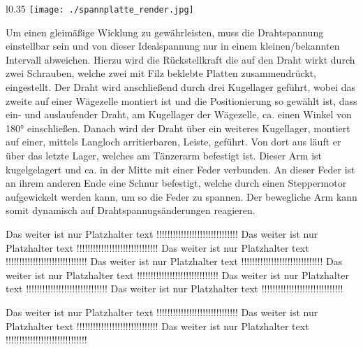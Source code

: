 \begin{wrapfigure}{l}{0.35\textwidth}
    \centering
    \texttt{[image: ./spannplatte\_render.jpg]}
\end{wrapfigure}
Um einen gleimäßige Wicklung zu gewährleisten, muss die Drahtspannung einstellbar sein und von dieser Idealspannung nur in einem kleinen/bekannten Intervall abweichen. Hierzu wird die Rückstellkraft die auf den Draht wirkt durch zwei Schrauben, welche zwei mit Filz beklebte Platten zusammendrückt, eingestellt. Der Draht wird anschließend durch drei Kugellager geführt, wobei das zweite auf einer Wägezelle montiert ist und die Positionierung so gewählt ist, dass ein- und auslaufender Draht, am Kugellager der Wägezelle, ca. einen Winkel von 180° einschließen. Danach wird der Draht über ein weiteres Kugellager, montiert auf einer, mittels Langloch arritierbaren, Leiste, geführt. Von dort aus läuft er über das letzte Lager, welches am Tänzerarm befestigt ist. Dieser Arm ist kugelgelagert und ca. in der Mitte mit einer Feder verbunden. An dieser Feder ist an ihrem anderen Ende eine Schnur befestigt, welche durch einen Steppermotor aufgewickelt werden kann, um so die Feder zu spannen. Der bewegliche Arm kann somit dynamisch auf Drahtspannugsänderungen reagieren.




Das weiter ist nur Platzhalter text !!!!!!!!!!!!!!!!!!!!!!!!!!!!!!
Das weiter ist nur Platzhalter text !!!!!!!!!!!!!!!!!!!!!!!!!!!!!!
Das weiter ist nur Platzhalter text !!!!!!!!!!!!!!!!!!!!!!!!!!!!!!
Das weiter ist nur Platzhalter text !!!!!!!!!!!!!!!!!!!!!!!!!!!!!!
Das weiter ist nur Platzhalter text !!!!!!!!!!!!!!!!!!!!!!!!!!!!!!
Das weiter ist nur Platzhalter text !!!!!!!!!!!!!!!!!!!!!!!!!!!!!!
Das weiter ist nur Platzhalter text !!!!!!!!!!!!!!!!!!!!!!!!!!!!!!

Das weiter ist nur Platzhalter text !!!!!!!!!!!!!!!!!!!!!!!!!!!!!!
Das weiter ist nur Platzhalter text !!!!!!!!!!!!!!!!!!!!!!!!!!!!!!
Das weiter ist nur Platzhalter text !!!!!!!!!!!!!!!!!!!!!!!!!!!!!!

